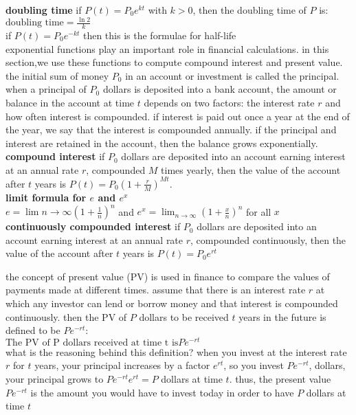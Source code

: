 \documentclass{article}
\begin{document}
\textbf{doubling time} if $P(t) = P_0e^{kt}$ with $k > 0$, then the doubling time of $P$ is:\\
$\text{doubling time} = \frac{\ln2}{k}$\\
if $P(t) = P_0e^{-kt}$ then this is the formulae for half-life\\

exponential functions play an important role in financial calculations. in this section,we use these functions to compute compound interest and present value. the initial sum of money $P_0$ in an account or investment is called the principal. when a principal of $P_0$ dollars is deposited into a bank account, the amount or balance in the account at time $t$ depends on two factors: the interest rate $r$ and how often interest is compounded. if interest is paid out once a year at the end of the year, we say that the interest is compounded annually. if the principal and interest are retained in the account, then the balance grows exponentially.\\

\textbf{compound interest} if $P_0$ dollars are deposited into an account earning interest at an annual rate $r$, compounded $M$ times yearly, then the value of the account after $t$ years is $P(t) = P_0(1 + \frac{r}{M})^{Mt}$.\\

\textbf{limit formula for $e$ and $e^x$}\\
$e = \lim{n \to \infty}(1 + \frac{1}{n})^n$ and $e^x = \lim_{n \to \infty}(1 + \frac{x}{n})^n$ for all $x$\\

\textbf{continuously compounded interest} if $P_0$ dollars are deposited into an account earning interest at an annual rate $r$, compounded continuously, then the value of the account after $t$ years is $P(t) = P_0e^{rt}$

the concept of present value (PV) is used in finance to compare the values of payments made at different times. assume that there is an interest rate $r$ at which any investor can lend or borrow money and that interest is compounded continuously. then the PV of $P$ dollars to be received $t$ years in the future is defined to be $Pe^{-rt}$:\\
$\text{The PV of P dollars received at time t is} Pe^{-rt}$\\
what is the reasoning behind this definition? when you invest at the interest rate $r$ for $t$ years, your principal increases by a factor $e^{rt}$, so you invest $Pe^{-rt}$, dollars, your principal grows to $Pe^{-rt}e^{rt} = P$ dollars at time $t$. thus, the present value $Pe^{-rt}$ is the amount you would have to invest today in order to have $P$ dollars at time $t$
\end{document}
